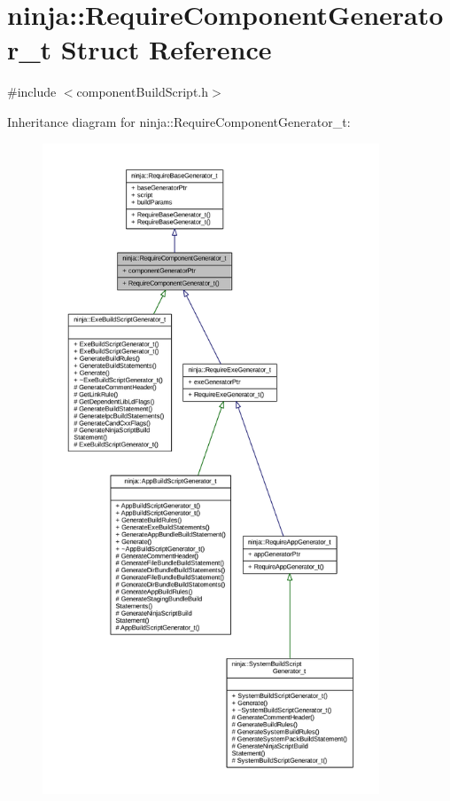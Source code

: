 \hypertarget{structninja_1_1_require_component_generator__t}{}\section{ninja\+:\+:Require\+Component\+Generator\+\_\+t Struct Reference}
\label{structninja_1_1_require_component_generator__t}


{\ttfamily \#include $<$component\+Build\+Script.\+h$>$}



Inheritance diagram for ninja\+:\+:Require\+Component\+Generator\+\_\+t\+:
\nopagebreak
\begin{figure}[H]
\begin{center}
\leavevmode
\includegraphics[height=550pt]{structninja_1_1_require_component_generator__t__inherit__graph}
\end{center}
\end{figure}


